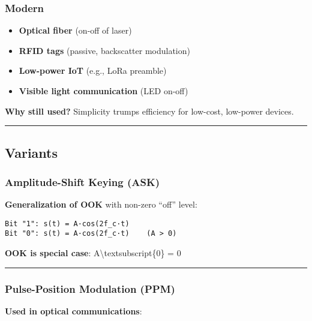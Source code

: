 \subsubsection{Modern}\label{modern}

\begin{itemize}
\tightlist
\item
  \textbf{Optical fiber} (on-off of laser)
\item
  \textbf{RFID tags} (passive, backscatter modulation)
\item
  \textbf{Low-power IoT} (e.g., LoRa preamble)
\item
  \textbf{Visible light communication} (LED on-off)
\end{itemize}

\textbf{Why still used?} Simplicity trumps efficiency for low-cost,
low-power devices.

\begin{center}\rule{0.5\linewidth}{0.5pt}\end{center}

\subsection{\texorpdfstring{ Variants}{ Variants}}\label{variants}

\subsubsection{Amplitude-Shift Keying
(ASK)}\label{amplitude-shift-keying-ask}

\textbf{Generalization of OOK} with non-zero ``off'' level:

\begin{verbatim}
Bit "1": s(t) = A·cos(2f_c·t)
Bit "0": s(t) = A·cos(2f_c·t)    (A > 0)
\end{verbatim}

\textbf{OOK is special case}: A\textbackslash textsubscript\{0\} = 0

\begin{center}\rule{0.5\linewidth}{0.5pt}\end{center}

\subsubsection{Pulse-Position Modulation
(PPM)}\label{pulse-position-modulation-ppm}

\textbf{Used in optical communications}:

